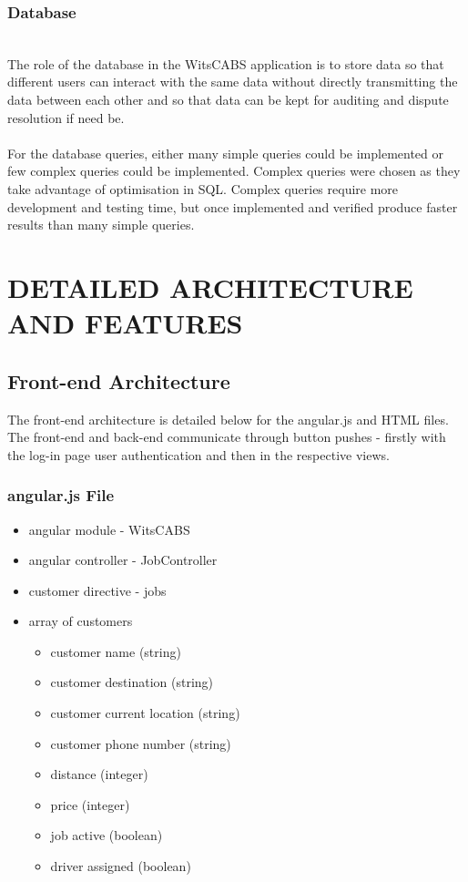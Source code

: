 \documentclass[10pt, onecolumn]{witseiepaper}
\begin{document}
\subsubsection{Database}\mbox{}\\
The role of the database in the WitsCABS application is to store data so that different users can interact with the same data without directly transmitting the data between each other and so that data can be kept for auditing and dispute resolution if need be.
\\ \\
For the database queries, either many simple queries could be implemented or few complex queries could be implemented. Complex queries were chosen as they take advantage of optimisation in SQL. Complex queries require more development and testing time, but once implemented and verified produce faster results than many simple queries.

\section{DETAILED ARCHITECTURE AND FEATURES}
\subsection{Front-end Architecture}
The front-end architecture is detailed below for the angular.js and HTML files. The front-end and back-end communicate through button pushes - firstly with the log-in page user authentication and then in the respective views.
\subsubsection{angular.js File}
\begin{itemize}
\item angular module - WitsCABS
\item angular controller - JobController
\item customer directive - jobs
\item array of customers
\begin{itemize}
\item customer name (string)
\item customer destination (string)
\item customer current location (string)
\item customer phone number (string)
\item distance (integer)
\item price (integer)
\item job active (boolean)
\item driver assigned (boolean)
\end{itemize}
\end{itemize}
\end{document}
